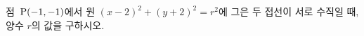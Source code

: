 점~$\mathrm{P}(-1{,}\mkern3mu\mathopen{}-1)$에서 원 $(x-2)^2+(y+2)^2=r^2$에 그은 두 접선이 서로 수직일 때, 양수 $r$의 값을 구하시오.
